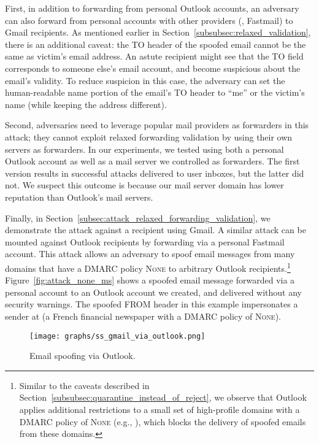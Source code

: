 First, in addition to forwarding from personal Outlook accounts, an
adversary can also forward from personal accounts with other providers
(\eg, Fastmail) to Gmail recipients.
As mentioned earlier in Section~\ref{subsubsec:relaxed_validation}, there is an additional caveat: the \textsc{TO} header of the spoofed email cannot be the same as victim's email address.
An astute recipient might see that the \textsc{TO} field corresponds to someone else's email account, and become suspicious about the email's validity.
To reduce suspicion in this case, the adversary can set the
human-readable name portion of the email's \textsc{TO} header to
``me'' or the victim's name (while keeping the address different).

Second, adversaries need to leverage popular mail providers as forwarders in this attack; they cannot exploit relaxed forwarding validation by using their own servers as forwarders.
In our experiments, we tested using both a personal Outlook account as well as a mail server we controlled as forwarders.
The first version results in successful attacks delivered to user inboxes, but the latter did not.
We suspect this outcome is because our mail server domain has lower reputation than Outlook's mail servers.

Finally, in Section~\ref{subsec:attack_relaxed_forwarding_validation}, we demonstrate the attack against a recipient using Gmail. A similar attack can be mounted against Outlook recipients by
forwarding via a personal Fastmail account. This attack allows an
adversary to spoof email messages from many domains that have a DMARC
policy \textsc{None} to arbitrary Outlook recipients.\footnote{Similar to the caveats described in
Section~\ref{subsubsec:quarantine_instead_of_reject}, we observe that Outlook applies
additional restrictions to a small set of high-profile domains with a
DMARC policy of \textsc{None} (e.g., ), which blocks the delivery of spoofed emails from these domains.}
Figure~\ref{fig:attack_none_ms} shows a spoofed email message
forwarded via a personal account to an Outlook account we created, and
delivered without any security warnings. The spoofed FROM header in
this example impersonates a sender at  (a French
financial newspaper with a DMARC policy of \textsc{None}).

\begin{figure}[t]
  \centerline{\texttt{[image: graphs/ss\_gmail\_via\_outlook.png]}}
  \centering
  \caption{Email spoofing  via Outlook.}
  \label{fig:ss_gmail_via_outlook}
  \end{figure}


